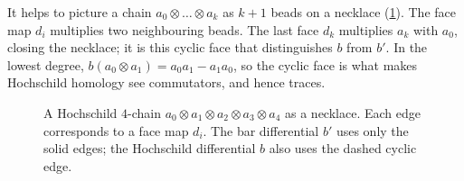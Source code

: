 \begin{discussion}
It helps to picture a chain $a_0\otimes\dots\otimes a_k$ as $k+1$ beads on
a necklace (\cref{hochschild:fig:faces}). The face map $d_i$ multiplies
two neighbouring beads. The last face $d_k$ multiplies $a_k$ with $a_0$,
closing the necklace; it is this cyclic face that distinguishes $b$ from
$b'$. In the lowest degree, $b(a_0\otimes a_1)=a_0a_1-a_1a_0$, so the cyclic
face is what makes Hochschild homology see commutators, and hence traces.
\end{discussion}

\begin{figure}[htbp]
\centering
{}
\caption[Face maps of the Hochschild complex]{A Hochschild $4$-chain
$a_0\otimes a_1\otimes a_2\otimes a_3\otimes a_4$ as a necklace. Each edge
corresponds to a face map $d_i$. The bar differential $b'$ uses only the
solid edges; the Hochschild differential $b$ also uses the dashed cyclic
edge.}
\label{hochschild:fig:faces}
\end{figure}

